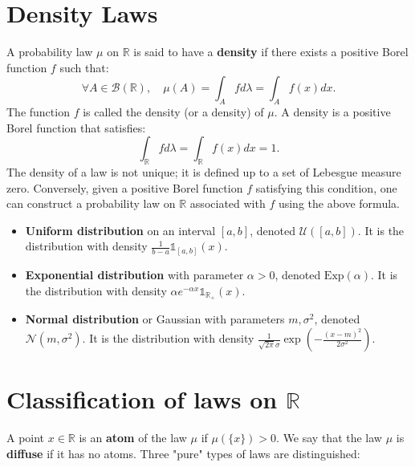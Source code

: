 \section{Density Laws}%
\begin{definition}
A probability law $\mu$ on $\mathbb{R}$ is said to have a \textbf{density} if there exists a positive Borel function $f$ such that:
\[
\forall A \in \mathcal{B}(\mathbb{R}), \quad \mu(A) = \int_A f d\lambda = \int_A f(x) dx.
\]
The function $f$ is called the density (or a density) of $\mu$. A density is a positive Borel function that satisfies:
\[
\int_{\mathbb{R}} f d\lambda = \int_{\mathbb{R}} f(x) dx = 1.
\]
The density of a law is not unique; it is defined up to a set of Lebesgue measure zero. Conversely, given a positive Borel function $f$ satisfying this condition, one can construct a probability law on $\mathbb{R}$ associated with $f$ using the above formula.
\end{definition}%
\begin{example}
\begin{itemize}
    \item \textbf{Uniform distribution} on an interval $[a,b]$, denoted $\mathcal{U}([a,b])$. It is the distribution with density $\frac{1}{b-a}\mathbb{1}_{[a,b]}(x)$.
    \item \textbf{Exponential distribution} with parameter $\alpha > 0$, denoted $\text{Exp}(\alpha)$. It is the distribution with density $\alpha e^{-\alpha x} \mathbb{1}_{\mathbb{R}_+}(x)$.
    \item \textbf{Normal distribution} or Gaussian with parameters $m, \sigma^2$, denoted $\mathcal{N}(m, \sigma^2)$. It is the distribution with density $\frac{1}{\sqrt{2\pi}\sigma} \exp\left(-\frac{(x-m)^2}{2\sigma^2}\right)$.
\end{itemize}
\end{example}%
\section{Classification of laws on $\mathbb{R}$}%
A point $x \in \mathbb{R}$ is an \textbf{atom} of the law $\mu$ if $\mu(\{x\}) > 0$.
We say that the law $\mu$ is \textbf{diffuse} if it has no atoms.
Three "pure" types of laws are distinguished:%

